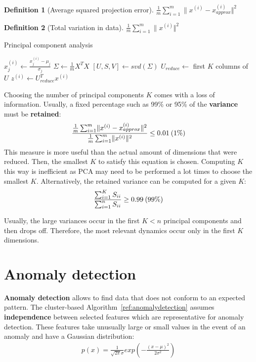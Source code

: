 \documentclass{report}
\newtheorem{definition}{Definition}[section]
\begin{document}
\begin{definition}[Average squared projection error]
$\frac{1}{m}\sum_{i=1}^m \lVert x^{(i)}-x_{approx}^{(i)} \Vert^2$
\end{definition}

\begin{definition}[Total variation in data]
$\frac{1}{m}\sum_{i=1}^m \lVert x^{(i)} \Vert^2$
\end{definition}

\begin{algorithm}
\caption{Principal component analysis}
\label{ref:pca}
\begin{algorithmic}
\State $x_j^{(i)} \gets \frac{x_j^{(i)} - \mu_j}{\sigma_j} $ 
\State $\Sigma \gets \frac{1}{m}X^TX$ 
\State $[U,S,V] \gets svd(\Sigma)$ 
\State $U_{reduce} \gets$ first $K$ columns of $U$ 
\State $z^{(i)} \gets U_{reduce}^Tx^{(i)}$ 
\end{algorithmic}
\end{algorithm}

Choosing the number of principal components $K$ comes with a loss of information. Usually, a fixed percentage such as 99\% or 95\% of the {\bf variance} must be {\bf retained}:
\begin{align*}
\frac{\frac{1}{m}\sum_{i=1}^m \lVert x^{(i)}-x_{approx}^{(i)} \Vert^2}{\frac{1}{m}\sum_{i=1}^m \lVert x^{(i)} \Vert^2} \le 0.01\:\mbox(1\%)
\end{align*}
This measure is more useful than the actual amount of dimensions that were reduced. Then, the smallest $K$ to satisfy this equation is chosen. Computing $K$ this way is inefficient as PCA may need to be performed a lot times to choose the smallest $K$. Alternatively, the retained variance can be computed for a given $K$:
\begin{align*}
\frac{\sum_{i=1}^{K}S_{ii}}{\sum_{i=1}^{n}S_{ii}} \ge 0.99\:\mbox(99\%)
\end{align*}

Usually, the large variances occur in the first $K<n$ principal components and then drops off. Therefore, the most relevant dynamics occur only in the first $K$ dimensions.


\section{Anomaly detection}
{\bf Anomaly detection} allows to find data that does not conform to an expected pattern. The cluster-based Algorithm~\ref{ref:anomalydetection} assumes {\bf independence} between selected features which are representative for anomaly detection. These features take unusually large or small values in the event of an anomaly and have a Gaussian distribution:
\begin{align*}
p(x)=\frac{1}{\sqrt{2\pi}\sigma}exp(-\frac{(x-\mu)^2}{2\sigma^2})
\end{align*}
\end{document}

